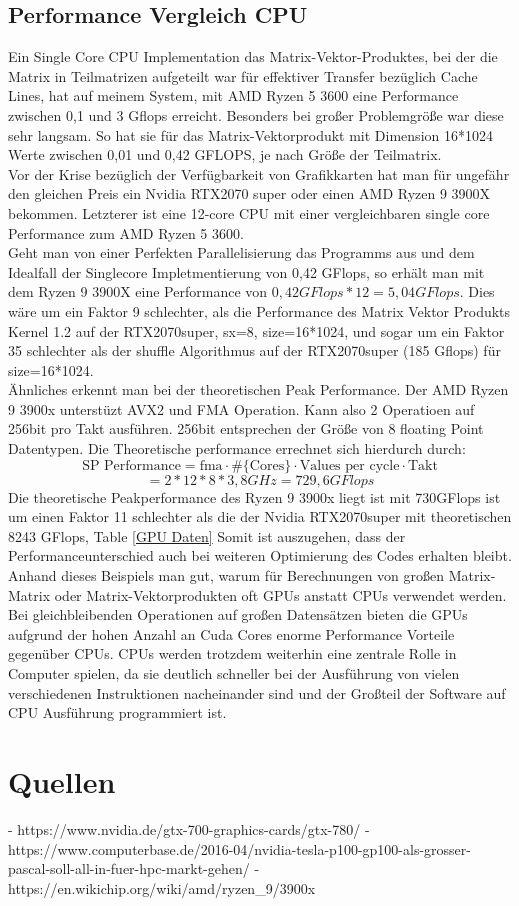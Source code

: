\documentclass[10pt,a4paper]{article}
\begin{document}
	  \subsection{Performance Vergleich CPU}
	  Ein Single Core CPU Implementation das Matrix-Vektor-Produktes, bei der die Matrix in Teilmatrizen aufgeteilt war für effektiver Transfer bezüglich Cache Lines, hat auf meinem System, mit AMD Ryzen 5 3600 eine Performance zwischen 0,1 und 3 Gflops erreicht. Besonders bei großer Problemgröße war diese sehr langsam. So hat sie für das Matrix-Vektorprodukt mit Dimension 16*1024 Werte zwischen 0,01 und 0,42 GFLOPS, je nach Größe der Teilmatrix.\\ 
	  Vor der Krise bezüglich der Verfügbarkeit von Grafikkarten hat man für ungefähr den gleichen Preis ein Nvidia RTX2070 super oder einen AMD Ryzen 9 3900X bekommen. Letzterer ist eine 12-core CPU mit einer vergleichbaren single core Performance zum AMD Ryzen 5 3600. \\
	  Geht man von einer Perfekten Parallelisierung das Programms aus und dem Idealfall der Singlecore Impletmentierung von 0,42 GFlops, so erhält man mit dem Ryzen 9 3900X eine Performance von $0,42GFlops*12=5,04 GFlops$. Dies wäre um ein Faktor 9 schlechter, als die Performance des Matrix Vektor Produkts Kernel 1.2 auf der RTX2070super, sx=8, size=16*1024, und sogar um ein Faktor 35 schlechter als der shuffle Algorithmus auf der RTX2070super (185 Gflops) für size=16*1024.\\
	  Ähnliches erkennt man bei der theoretischen Peak Performance. Der AMD Ryzen 9 3900x  unterstüzt AVX2 und FMA Operation. Kann also 2 Operatioen auf 256bit pro Takt ausführen. 256bit entsprechen der Größe von 8 floating Point Datentypen. Die Theoretische performance errechnet sich hierdurch durch:
	  $$\text{SP Performance}=\text{fma}\cdot \#\{\text{Cores}\}\cdot\text{Values per cycle}\cdot \text{Takt}$$ $$=2*12*8*3,8GHz=729,6 GFlops$$
	  Die theoretische Peakperformance des Ryzen 9 3900x liegt ist mit 730GFlops ist um einen Faktor 11 schlechter als die der Nvidia RTX2070super mit theoretischen 8243 GFlops, Table \ref{GPU Daten} Somit ist auszugehen, dass der Performanceunterschied auch bei weiteren Optimierung des Codes erhalten bleibt. \\ 
	   Anhand dieses Beispiels man gut, warum für Berechnungen von großen Matrix-Matrix oder Matrix-Vektorprodukten oft GPUs anstatt CPUs verwendet werden. Bei gleichbleibenden Operationen auf großen Datensätzen bieten die GPUs aufgrund der hohen Anzahl an Cuda Cores enorme Performance Vorteile gegenüber CPUs. CPUs werden trotzdem weiterhin eine zentrale Rolle in Computer spielen, da sie deutlich schneller bei der Ausführung von vielen verschiedenen Instruktionen nacheinander sind und der Großteil der Software auf CPU Ausführung programmiert ist.  
	  
	 \section{Quellen} 
	 - https://www.nvidia.de/gtx-700-graphics-cards/gtx-780/
	 -https://www.computerbase.de/2016-04/nvidia-tesla-p100-gp100-als-grosser-pascal-soll-all-in-fuer-hpc-markt-gehen/
	 -https://en.wikichip.org/wiki/amd/ryzen_9/3900x
\end{document}
